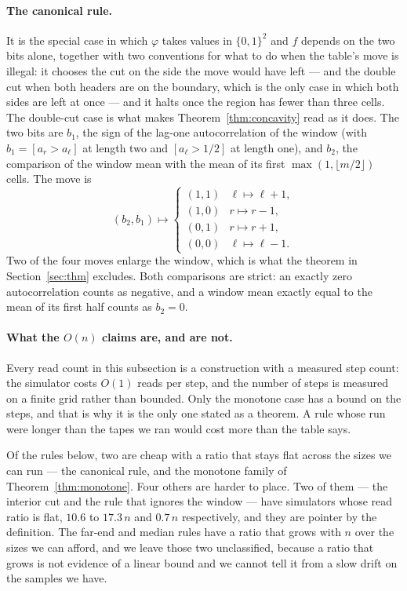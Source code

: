 \documentclass[11pt]{article}
\begin{document}
\paragraph{The canonical rule.} It is the special case in which $\varphi$ takes values in
$\{0,1\}^{2}$ and $f$ depends on the two bits alone, together with two conventions for what to do when the
table's move is illegal: it chooses the cut on the side the move would have left --- and the double
cut when both headers are on the boundary, which is the only case in which both sides are left at
once --- and it halts once the region has fewer than three cells. The double-cut case is what makes
Theorem~\ref{thm:concavity} read as it does. The two bits are $b_1$, the sign of the lag-one
autocorrelation of the window (with $b_1=[a_r>a_\ell]$ at length two and $[a_\ell>1/2]$ at length one),
and $b_2$, the comparison of the window mean with the mean of its first
$\max(1,\lfloor m/2\rfloor)$ cells. The move is
\[
(b_2,b_1)\mapsto
\begin{cases}
(1,1)&\ell\mapsto\ell+1,\\
(1,0)&r\mapsto r-1,\\
(0,1)&r\mapsto r+1,\\
(0,0)&\ell\mapsto\ell-1.
\end{cases}
\]
Two of the four moves enlarge the window, which is what the theorem in Section~\ref{sec:thm}
excludes. Both comparisons are strict: an exactly zero autocorrelation counts as negative, and a
window mean exactly equal to the mean of its first half counts as $b_2=0$.

\paragraph{What the $O(n)$ claims are, and are not.} Every read count in this subsection is a
construction with a measured step count: the simulator costs $O(1)$ reads per step, and the number
of steps is measured on a finite grid rather than bounded. Only the monotone case has a bound on
the steps, and that is why it is the only one stated as a theorem. A rule whose run were longer
than the tapes we ran would cost more than the table says.

Of the rules below, two are cheap with a ratio that stays flat across the sizes we can run --- the
canonical rule, and the monotone family of Theorem~\ref{thm:monotone}. Four others are harder to place. Two of
them --- the interior cut and the rule that ignores the window --- have simulators whose read ratio is
flat, $10.6$ to $17.3\,n$ and $0.7\,n$ respectively, and they are pointer by the definition. The
far-end and median rules have a ratio that grows with $n$ over the sizes we can afford, and we leave
those two unclassified, because a ratio that grows is not evidence of a linear bound and we cannot
tell it from a slow drift on the samples we have.
\end{document}
